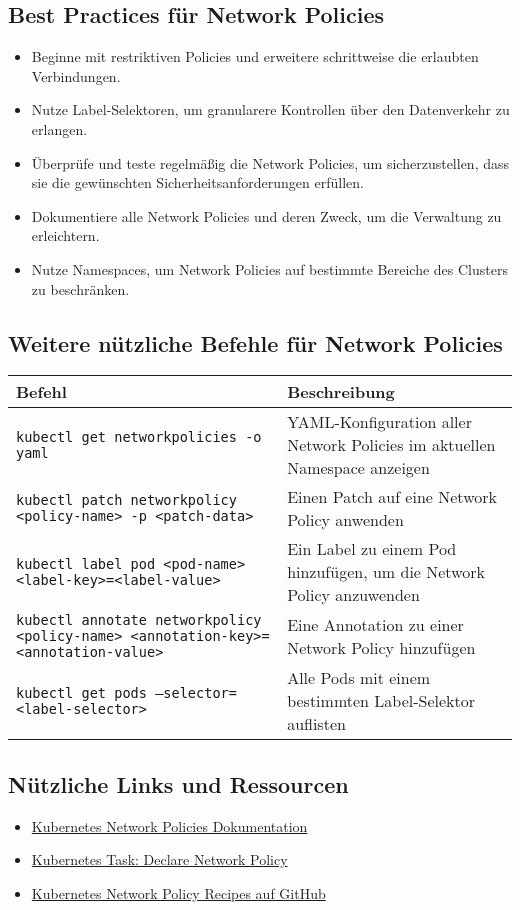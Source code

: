 \subsection{Best Practices für Network Policies}
\begin{itemize}
    \item Beginne mit restriktiven Policies und erweitere schrittweise die erlaubten Verbindungen.
    \item Nutze Label-Selektoren, um granularere Kontrollen über den Datenverkehr zu erlangen.
    \item Überprüfe und teste regelmäßig die Network Policies, um sicherzustellen, dass sie die gewünschten Sicherheitsanforderungen erfüllen.
    \item Dokumentiere alle Network Policies und deren Zweck, um die Verwaltung zu erleichtern.
    \item Nutze Namespaces, um Network Policies auf bestimmte Bereiche des Clusters zu beschränken.
\end{itemize}

\subsection{Weitere nützliche Befehle für Network Policies}
\begin{tabular}{|p{}|p{}|}
\hline
\textbf{Befehl} & \textbf{Beschreibung} \\
\hline
\texttt{kubectl get networkpolicies -o yaml} & YAML-Konfiguration aller Network Policies im aktuellen Namespace anzeigen \\
\texttt{kubectl patch networkpolicy <policy-name> -p <patch-data>} & Einen Patch auf eine Network Policy anwenden \\
\texttt{kubectl label pod <pod-name> <label-key>=<label-value>} & Ein Label zu einem Pod hinzufügen, um die Network Policy anzuwenden \\
\texttt{kubectl annotate networkpolicy <policy-name> <annotation-key>=<annotation-value>} & Eine Annotation zu einer Network Policy hinzufügen \\
\texttt{kubectl get pods --selector=<label-selector>} & Alle Pods mit einem bestimmten Label-Selektor auflisten \\
\hline
\end{tabular}

\subsection{Nützliche Links und Ressourcen}
\begin{itemize}
    \item \href{https://kubernetes.io/docs/concepts/services-networking/network-policies/}{Kubernetes Network Policies Dokumentation}
    \item \href{https://kubernetes.io/docs/tasks/administer-cluster/declare-network-policy/}{Kubernetes Task: Declare Network Policy}
    \item \href{https://github.com/ahmetb/kubernetes-network-policy-recipes}{Kubernetes Network Policy Recipes auf GitHub}
\end{itemize}
